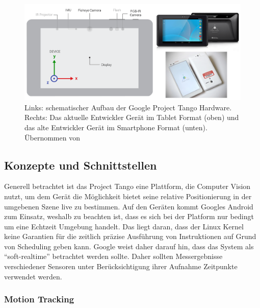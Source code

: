 \begin{figure}[h]
  \centering
	\includegraphics[width=1.0\textwidth]{content/images/theory/tango-device.png} 
  \caption{Links: schematischer Aufbau der Google Project Tango Hardware. Rechts: Das aktuelle Entwickler Gerät im Tablet Format (oben) und das alte Entwickler Gerät im Smartphone Format (unten). Übernommen von \citet{GoogleDevelopers:online}}
  \label{fig:tango-device}
\end{figure}

\subsection{Konzepte und Schnittstellen}

Generell betrachtet ist das Project Tango eine Plattform, die Computer Vision nutzt, um dem Gerät die Möglichkeit bietet seine relative Positionierung in der umgebenen Szene live zu bestimmen. Auf den Geräten kommt Googles Android zum Einsatz, weshalb zu beachten ist, dass es sich bei der Platform nur bedingt um eine Echtzeit Umgebung handelt. Das liegt daran, dass der Linux Kernel keine Garantien für die zeitlich präzise Ausführung von Instruktionen auf Grund von Scheduling geben kann. Google weist daher darauf hin, dass das System als \enquote{soft-realtime} betrachtet werden sollte. Daher sollten Messergebnisse verschiedener Sensoren unter Berücksichtigung ihrer Aufnahme Zeitpunkte verwendet werden. \citep{GoogleDevelopersConcepts:online} \\

\subsubsection{Motion Tracking}

